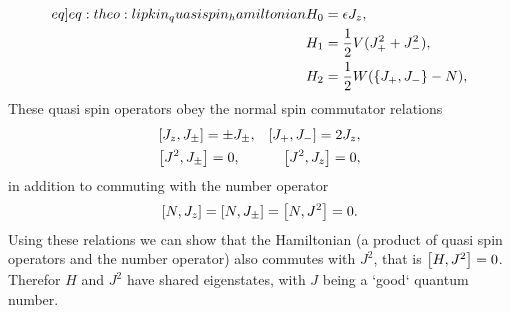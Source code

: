 \begin{align}
    \begin{split} \label[eq]{eq:theo:lipkin_quasispin_hamiltonian}
        H_0 &= \epsilon J_z, \\
        H_1 &= \frac{1}{2}V (J_+^2 + J_-^2), \\
        H_2 &= \frac{1}{2}W ( \set{J_+ , J_- } - N ),
    \end{split}
\end{align}
These quasi spin operators obey the normal spin commutator relations
\begin{align*}
    &\commutator{J_z}{J_\pm} = \pm J_\pm, 
    &\commutator{J_+}{J_-} = 2 J_z, \\
    &\commutator{J^2}{J_\pm} = 0,
    &\commutator{J^2}{J_z} = 0,
\end{align*}
in addition to commuting with the number operator
\begin{align*}
    \commutator{N}{J_z} = \commutator{N}{J_\pm} = \commutator{N}{J^2} = 0.
\end{align*}
Using these relations we can show that the Hamiltonian (a product of quasi spin operators and the number operator) also commutes with  $J^2$, that is $\commutator{H}{J^2}=0$. Therefor $H$ and $J^2$ have shared eigenstates, with $J$ being a `good` quantum number.